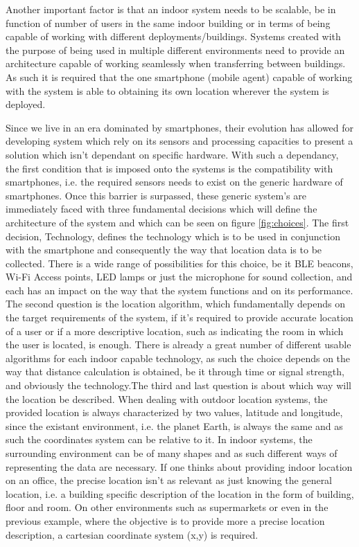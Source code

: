 Another important factor is that an indoor system needs to be scalable, be in function of number of users in the same indoor building or in terms of being capable of working with different deployments/buildings. Systems created with the purpose of being used in multiple different environments need to provide an architecture capable of working seamlessly when transferring between buildings. As such it is required that the one smartphone (mobile agent) capable of working with the system is able to obtaining its own location wherever the system is deployed.  

Since we live in an era dominated by smartphones, their evolution has allowed for developing system which rely on its sensors and processing capacities to present a solution which isn't dependant on specific hardware. With such a dependancy, the first condition that is imposed onto the systems is the compatibility with smartphones, i.e. the required sensors needs to exist on the generic hardware of smartphones. Once this barrier is surpassed, these generic system's are immediately faced with three fundamental decisions which will define the architecture of the system and which can be seen on figure \ref{fig:choices}. The first decision, Technology, defines the technology which is to be used in conjunction with the smartphone and consequently the way that location data is to be collected. There is a wide range of possibilities for this choice, be it BLE beacons, Wi-Fi Access points, LED lamps or just the microphone for sound collection, and each has an impact on the way that the system functions and on its performance. The second question is the location algorithm, which fundamentally depends on the target requirements of the system, if it's required to provide accurate location of a user or if a more descriptive location, such as indicating the room in which the user is located, is enough. There is already a great number of different usable algorithms for each indoor capable technology, as such the choice depends on the way that distance calculation is obtained, be it through time or signal strength, and obviously the technology.The third and last question is about which way will the location be described. When dealing with outdoor location systems, the provided location is always characterized by two values, latitude and longitude, since the existant environment, i.e. the planet Earth, is always the same and as such the coordinates system can be relative to it. In indoor systems, the surrounding environment can be of many shapes and as such different ways of representing the data are necessary. If one thinks about providing indoor location on an office, the precise location isn't as relevant as just knowing the general location, i.e. a building specific description of the location in the form of building, floor and room. On other environments such as supermarkets or even in the previous example, where the objective is to provide more a precise location description, a cartesian coordinate system (x,y) is required.

